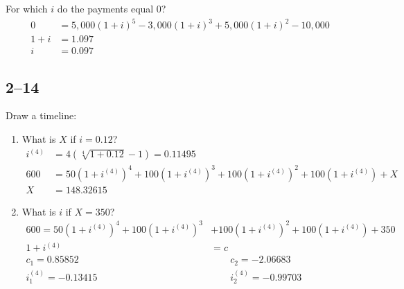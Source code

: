 \documentclass[a4paper, 12pt, reqno]{amsart}
\numberwithin{equation}{section}
\begin{document}
For which $i$ do the payments equal 0?
\begin{equation}\nonumber
    \begin{aligned}
        0 &= 5,000(1+i)^5 - 3,000(1+i)^3 + 5,000(1+i)^2 - 10,000 \\
        1 + i &= 1.097 \\
        i &= 0.097
    \end{aligned}
\end{equation}

\subsection*{2--14}

Draw a timeline:\\

\begin{center}
\end{center}

\begin{enumerate}[label=(\alph*)]
    \item What is $X$ if $i=0.12$?
        \begin{equation}\nonumber
            \begin{aligned}
                i^{(4)} &= 4\left(\sqrt[4]{1+0.12}-1\right) = 0.11495    \\
                600 &= 50\left(1+i^{(4)}\right)^4 + 100\left(1+i^{(4)}\right)^3 
                    + 100\left(1+i^{(4)}\right)^2 + 100\left(1+i^{(4)}\right) + 
                    X \\
                X &= 148.32615
            \end{aligned}
        \end{equation}
    \item What is $i$ if $X=350$?
        \begin{equation}\nonumber
            \begin{aligned}
                600 = 50\left(1+i^{(4)}\right)^4 + 100\left(1+i^{(4)}\right)^3 
                    &+ 100\left(1+i^{(4)}\right)^2 + 100\left(1+i^{(4)}\right) + 
                    350 \\
                1 + i^{(4)} &= c \\
                c_1 = 0.85852   &\qquad c_2 = -2.06683  \\
                i_1^{(4)} = -0.13415 &\qquad i_2^{(4)} = -0.99703  
            \end{aligned}
        \end{equation}
\end{enumerate}
\end{document}
